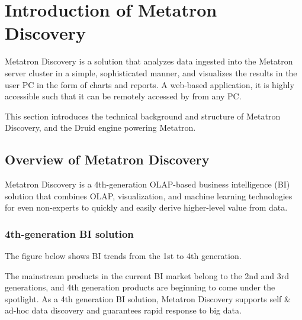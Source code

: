 \documentclass[letterpaper,10pt,english]{sphinxmanual}
\begin{document}
\chapter{Introduction of Metatron Discovery}
\label{\detokenize{discovery/part01/index:metatron-discovery}}\label{\detokenize{discovery/part01/index::doc}}
Metatron Discovery is a solution that analyzes data ingested into the Metatron server cluster in a simple, sophisticated manner, and visualizes the results in the user PC in the form of charts and reports. A web-based application, it is highly accessible such that it can be remotely accessed by from any PC.

This section introduces the technical background and structure of Metatron Discovery, and the Druid engine powering Metatron.


\section{Overview of Metatron Discovery}
\label{\detokenize{discovery/part01/overview:metatron-discovery}}\label{\detokenize{discovery/part01/overview::doc}}
Metatron Discovery is a 4th-generation OLAP-based business intelligence (BI) solution that combines OLAP, visualization, and machine learning technologies for even non-experts to quickly and easily derive higher-level value from data.
\begin{quote}

\begin{figure}[H]
\centering

\noindent{}
\end{figure}
\end{quote}


\subsection{4th-generation BI solution}
\label{\detokenize{discovery/part01/overview:bi}}
The figure below shows BI trends from the 1st to 4th generation.
\begin{quote}

\begin{figure}[H]
\centering

\noindent{}
\end{figure}
\end{quote}

The mainstream products in the current BI market belong to the 2nd and 3rd generations, and 4th generation products are beginning to come under the spotlight. As a 4th generation BI solution, Metatron Discovery supports self \& ad-hoc data discovery and guarantees rapid response to big data.
\end{document}
